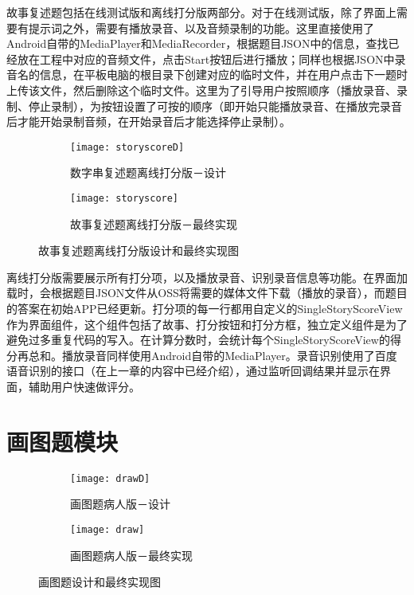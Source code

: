 故事复述题包括在线测试版和离线打分版两部分。对于在线测试版，除了界面上需要有提示词之外，需要有播放录音、以及音频录制的功能。这里直接使用了Android自带的MediaPlayer和MediaRecorder，根据题目JSON中的信息，查找已经放在工程中对应的音频文件，点击Start按钮后进行播放；同样也根据JSON中录音名的信息，在平板电脑的根目录下创建对应的临时文件，并在用户点击下一题时上传该文件，然后删除这个临时文件。这里为了引导用户按照顺序（播放录音、录制、停止录制），为按钮设置了可按的顺序（即开始只能播放录音、在播放完录音后才能开始录制音频，在开始录音后才能选择停止录制）。

\begin{figure}[h]
\centering%
\begin{subfigure}{6cm}
\texttt{[image: storyscoreD]}
\caption{数字串复述题离线打分版－设计}
\end{subfigure}
\hspace{4em}%
\begin{subfigure}{6cm}
\texttt{[image: storyscore]}
\caption{故事复述题离线打分版－最终实现}
\end{subfigure}
\caption{故事复述题离线打分版设计和最终实现图}
\label{fig:big1-subfigure}
\end{figure}

离线打分版需要展示所有打分项，以及播放录音、识别录音信息等功能。在界面加载时，会根据题目JSON文件从OSS将需要的媒体文件下载（播放的录音），而题目的答案在初始APP已经更新。打分项的每一行都用自定义的SingleStoryScoreView作为界面组件，这个组件包括了故事、打分按钮和打分方框，独立定义组件是为了避免过多重复代码的写入。在计算分数时，会统计每个SingleStoryScoreView的得分再总和。播放录音同样使用Android自带的MediaPlayer。录音识别使用了百度语音识别的接口（在上一章的内容中已经介绍），通过监听回调结果并显示在界面，辅助用户快速做评分。

\section{画图题模块}

\begin{figure}[h]
\centering%
\begin{subfigure}{6cm}
\texttt{[image: drawD]}
\caption{画图题病人版－设计}
\end{subfigure}
\hspace{4em}%
\begin{subfigure}{6cm}
\texttt{[image: draw]}
\caption{画图题病人版－最终实现}
\end{subfigure}
\caption{画图题设计和最终实现图}
\label{fig:big1-subfigure}
\end{figure}

